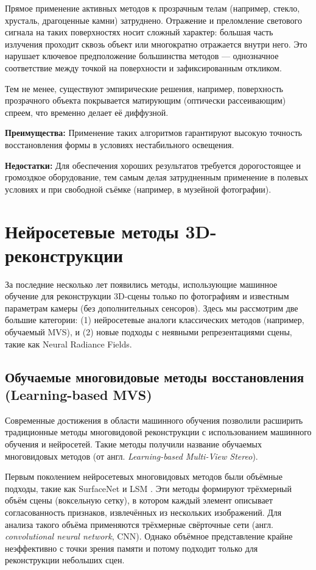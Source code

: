 Прямое применение активных методов к прозрачным телам (например, стекло,
хрусталь, драгоценные камни) затруднено. Отражение и преломление светового
сигнала на таких поверхностях носит сложный характер: большая часть излучения
проходит сквозь объект или многократно отражается внутри него. Это нарушает
ключевое предположение большинства методов — однозначное соответствие между
точкой на поверхности и зафиксированным откликом.

Тем не менее, существуют эмпирические решения, например, поверхность прозрачного
объекта покрывается матирующим (оптически рассеивающим) спреем, что временно делает
её диффузной.

\textbf{Преимущества:} Применение таких алгоритмов гарантируют высокую точность
восстановления формы в условиях нестабильного освещения.

\textbf{Недостатки:} Для обеспечения хороших результатов требуется дорогостоящее
и громоздкое оборудование, тем самым делая затрудненным применение в полевых
условиях и при свободной съёмке (например, в музейной фотографии).

\section{Нейросетевые методы 3D-реконструкции}

За последние несколько лет появились методы, использующие машинное обучение для
реконструкции 3D-сцены только по фотографиям и известным параметрам камеры (без
дополнительных сенсоров). Здесь мы рассмотрим две большие категории: (1)
нейросетевые аналоги классических методов (например, обучаемый MVS), и (2) новые
подходы с неявными репрезентациями сцены, такие как Neural Radiance
Fields.

\subsection{Обучаемые многовидовые методы восстановления (Learning-based MVS)}

Современные достижения в области машинного обучения позволили расширить
традиционные методы многовидовой реконструкции с использованием машинного
обучения и нейросетей. Такие методы получили название обучаемых многовидовых
методов (от англ. \emph{Learning-based Multi-View Stereo}).

Первым поколением нейросетевых многовидовых методов были объёмные подходы, такие
как SurfaceNet \cite{ji2017surfacenet} и LSM
\cite{kar2017learningmultiviewstereomachine}. Эти методы формируют трёхмерный
объём сцены (воксельную сетку), в котором каждый элемент описывает
согласованность признаков, извлечённых из нескольких изображений. Для анализа
такого объёма применяются трёхмерные свёрточные сети (англ. \emph{convolutional neural
network}, CNN). Однако объёмное представление крайне неэффективно с точки зрения
памяти и потому подходит только для реконструкции небольших сцен.

